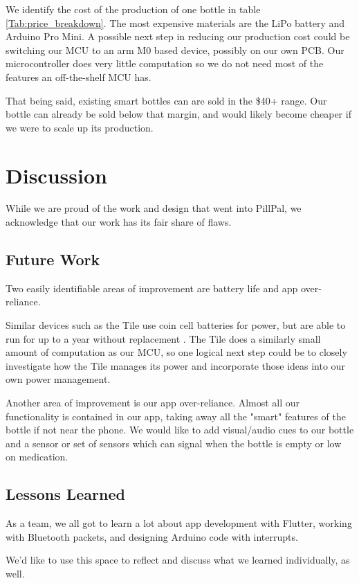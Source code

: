 \documentclass[sigconf]{acmart}
\begin{document}
We identify the cost of the production of one bottle in table \ref{Tab:price_breakdown}. The most expensive materials are the LiPo battery and Arduino Pro Mini. A possible next step in reducing our production cost could be switching our MCU to an arm M0 based device, possibly on our own PCB. Our microcontroller does very little computation so we do not need most of the features an off-the-shelf MCU has.

That being said, existing smart bottles can are sold in the \$40+ range. Our bottle can already be sold below that margin, and would likely become cheaper if we were to scale up its production.


\section{Discussion}
While we are proud of the work and design that went into PillPal, we acknowledge that our work has its fair share of flaws.

\subsection{Future Work}
Two easily identifiable areas of improvement are battery life and app over-reliance.

Similar devices such as the Tile use coin cell batteries for power, but are able to run for up to a year without replacement \cite{tile}. The Tile does a similarly small amount of computation as our MCU, so one logical next step could be to closely investigate how the Tile manages its power and incorporate those ideas into our own power management.

Another area of improvement is our app over-reliance. Almost all our functionality is contained in our app, taking away all the "smart" features of the bottle if not near the phone. We would like to add visual/audio cues to our bottle and a sensor or set of sensors which can signal when the bottle is empty or low on medication.

\subsection{Lessons Learned}
As a team, we all got to learn a lot about app development with Flutter, working with Bluetooth packets, and designing Arduino code with interrupts.

We'd like to use this space to reflect and discuss what we learned individually, as well.
\end{document}
